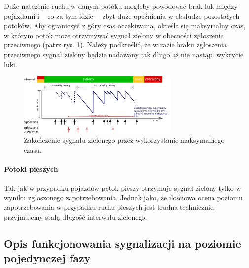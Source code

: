 \documentclass{pracamgr}
\theoremstyle{plain}
\begin{document}
Duże natężenie ruchu w danym potoku mogłoby powodować brak luk między
pojazdami i -- co za tym idzie~-- zbyt duże opóźnienia w obsłudze
pozostałych potoków. Aby ograniczyć z góry czas oczekiwania, określa
się maksymalny czas, w którym potok może otrzymywać sygnał zielony w
obecności zgłoszenia przeciwnego (patrz
rys. \ref{img:max-out}). Należy podkreślić, że w razie braku
zgłoszenia przeciwnego sygnał zielony będzie nadawany tak długo aż nie
nastąpi wykrycie luki.
\begin{figure}[ht] \centering
  \includegraphics[width=0.7\textwidth]{img/signals-max-out}
  \caption{Zakończenie sygnału zielonego przez wykorzystanie
maksymalnego czasu.}
\label{img:max-out}
\end{figure}

\paragraph{Potoki pieszych} Tak jak w przypadku pojazdów potok pieszy
otrzymuje sygnał zielony tylko w wyniku zgłoszonego
zapotrzebowania. Jednak jako, że ilościowa ocena poziomu
zapotrzebowania w przypadku ruchu pieszych jest trudna technicznie,
przyjmujemy stałą długość interwału zielonego.

\subsection{Opis funkcjonowania sygnalizacji na poziomie pojedynczej
fazy}
\end{document}
